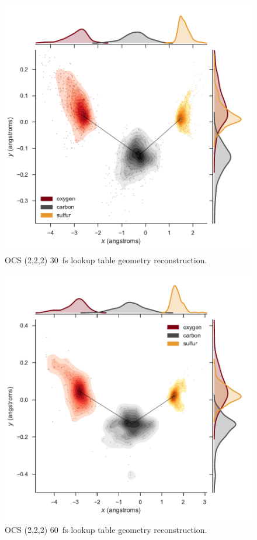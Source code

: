 \begin{figure}[H]
  \centering
  \includegraphics[width=\textwidth]{Plots/OCS22230fsLTGeometry}
  \caption[OCS (2,2,2) \SI{30}{\fs} lookup table geometry reconstruction.]
  {OCS (2,2,2) \SI{30}{\fs} lookup table geometry reconstruction.}
  \label{fig:OCS22230fsLTGeometry}
\end{figure}

\begin{figure}
  \centering
  \includegraphics[width=\textwidth]{Plots/OCS22260fsLTGeometry}
  \caption[OCS (2,2,2) \SI{60}{\fs} lookup table geometry reconstruction.]
  {OCS (2,2,2) \SI{60}{\fs} lookup table geometry reconstruction.}
  \label{fig:OCS22260fsLTGeometry}
\end{figure}

